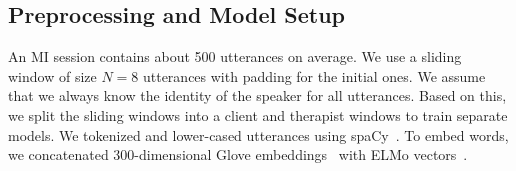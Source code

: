 
\subsection{Preprocessing and Model Setup}


An MI session contains about 500 utterances on average. We use a
sliding window of size $N=8$ utterances with padding for the initial
ones. We assume that we always know the identity of the speaker for
all utterances. Based on this, we split the sliding windows into a
client and therapist windows to train separate models.
%
We tokenized and lower-cased utterances using
spaCy~\cite{spacy2}. To embed words, we concatenated 300-dimensional
Glove embeddings~\cite{pennington2014glove} with ELMo
vectors~\cite{Peters:2018}. 


